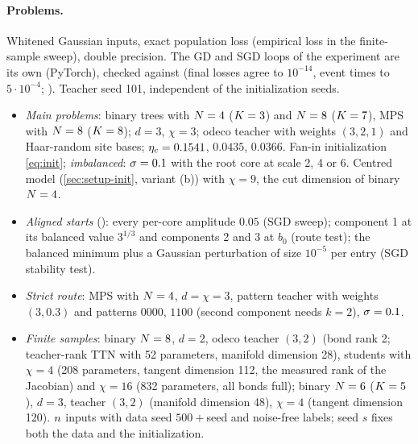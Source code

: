 \paragraph{Problems.}
Whitened Gaussian inputs, exact population loss (empirical loss in the finite-sample sweep), double
precision. The GD and SGD loops of the experiment are its own (PyTorch), checked against
 (final losses agree to $10^{-14}$, event times to $5\cdot10^{-4}$;
). Teacher seed 101, independent of the initialization seeds.
\begin{itemize}
  \item \emph{Main problems}: binary trees with $N=4$ ($K=3$) and $N=8$ ($K=7$), MPS with $N=8$
    ($K=8$); $d=3$, $\chi=3$; odeco teacher with weights $(3,2,1)$ and Haar-random site bases;
    $\eta_c=0.1541$, $0.0435$, $0.0366$. Fan-in initialization \eqref{eq:init}; \emph{imbalanced}: $\sigma=0.1$
    with the root core at scale 2, 4 or 6. Centred model (\cref{sec:setup-init}, variant (b)) with $\chi=9$, the
    cut dimension of binary $N=4$.
  \item \emph{Aligned starts} (): every per-core amplitude $0.05$ (SGD sweep);
    component 1 at its balanced value $3^{1/3}$ and components 2 and 3 at $b_0$ (route test); the
    balanced minimum plus a Gaussian perturbation of size $10^{-5}$ per entry (SGD stability test).
  \item \emph{Strict route}: MPS with $N=4$, $d=\chi=3$, pattern teacher with weights $(3,0.3)$ and patterns
    $0000$, $1100$ (second component needs $k=2$), $\sigma=0.1$.
  \item \emph{Finite samples}: binary $N=8$, $d=2$, odeco teacher $(3,2)$ (bond rank 2; teacher-rank TTN with 52
    parameters, manifold dimension 28), students with $\chi=4$ (208 parameters, tangent dimension 112, the
    measured rank of the Jacobian) and $\chi=16$ (832 parameters, all bonds full); binary $N=6$ ($K=5$), $d=3$,
    teacher $(3,2)$ (manifold dimension 48), $\chi=4$ (tangent dimension 120). $n$ inputs with data seed
    $500+$seed and noise-free labels; seed $s$ fixes both the data and the initialization.
\end{itemize}


